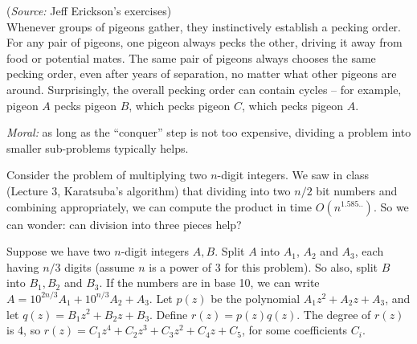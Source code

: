 \documentclass[addpoints]{exam}
\begin{document}
\begin{questions}
({\em Source:} Jeff Erickson's exercises)\\
Whenever groups of pigeons gather, they instinctively establish a pecking order. For any pair of pigeons, one pigeon always pecks the other, driving it away from food or potential mates. The same pair of pigeons always chooses the same pecking order, even after years of separation, no matter what other pigeons are around. Surprisingly, the overall pecking order can contain cycles -- for example, pigeon $A$ pecks pigeon $B$, which pecks pigeon $C$, which pecks pigeon $A$. 


{\em Moral:} as long as the ``conquer'' step is not too expensive, dividing a problem into smaller sub-problems typically helps. 

Consider the problem of multiplying two $n$-digit integers.  We saw in class (Lecture 3, Karatsuba's algorithm) that dividing into two $n/2$ bit numbers and combining appropriately, we can compute the product in time $O(n^{1.585..})$. So we can wonder: can division into three pieces help?

Suppose we have two $n$-digit integers $A, B$. Split $A$ into $A_1$,  $A_2$ and $A_3$, each having $n/3$ digits (assume $n$ is a power of $3$ for this problem). So also, split $B$ into $B_1, B_2$ and $B_3$. If the numbers are in base 10, we can write $A = 10^{2n/3} A_1 + 10^{n/3} A_2 + A_3$.  Let $p(z)$ be the polynomial $A_1 z^2 + A_2 z + A_3$, and let $q(z) = B_1 z^2 + B_2 z + B_3$.  Define $r(z) = p(z) q(z)$.  The degree of $r(z)$ is $4$, so $r(z) = C_1 z^4 + C_2 z^3 + C_3 z^2 + C_4 z + C_5$, for some coefficients $C_i$.  


\end{questions}
\end{document}
